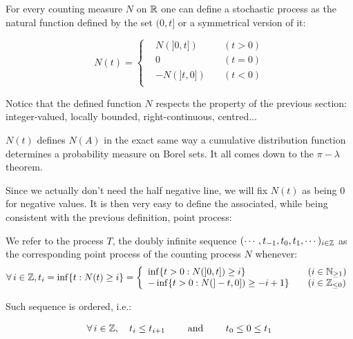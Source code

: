 \begin{definition}
For every counting measure $N$ on $\mathbb{R}$ one can define a stochastic process as the natural function defined by the set $(0,t]$ or a symmetrical version of it:

$$N(t) = \left\{
    \begin{array}{lll}
         &N \left ( ]0,t] \right ) \quad &(t > 0)  \\
         &0 \quad &(t= 0)   \\
         &- N \left ( ]t,0] \right ) \quad &(t < 0) \\
    \end{array}
\right. $$
\end{definition}


Notice that the defined function $N$ respects the property of the previous section: integer-valued, locally bounded, right-continuous, centred...

\begin{remarque}
$N(t)$ defines $N(A)$ in the exact same way a cumulative distribution function determines a probability measure on Borel sets. It all comes down to the $ \pi - \lambda $ theorem.
\end{remarque}

Since we actually don't need the half negative line, we will fix $N(t)$ as being $0$ for negative values. It is then very easy to define the associated, while being consistent with the previous definition, point process:

\begin{definition}
We refer to the process $T$, the doubly infinite sequence $( \cdots, t_{-1}, t_0, t_1, \cdots)_{i \in \mathbb{Z}}$ as the corresponding point process of the counting process $N$ whenever:
\begin{equation}
\forall i \in \Z, t_i = \inf \{ t : N(t) \geq i \} = \left\{
    \begin{array}{ll}
           \inf \{ t > 0 : N( ]0,t] ) \geq i \} \quad &( i \in \mathbb N_{\geq 1})  \\
          - \inf \{ t > 0 : N( ]-t, 0] ) \geq -i+1 \} \quad &(i \in \mathbb Z_{\leq 0}) \\
    \end{array}
\right. 
\end{equation}
\end{definition}

Such sequence is ordered, i.e.:

$$ \forall i \in \Z, \quad t_i \leq t_{i+1} \qquad \text{ and } \qquad t_0 \leq 0 \leq t_1 $$

